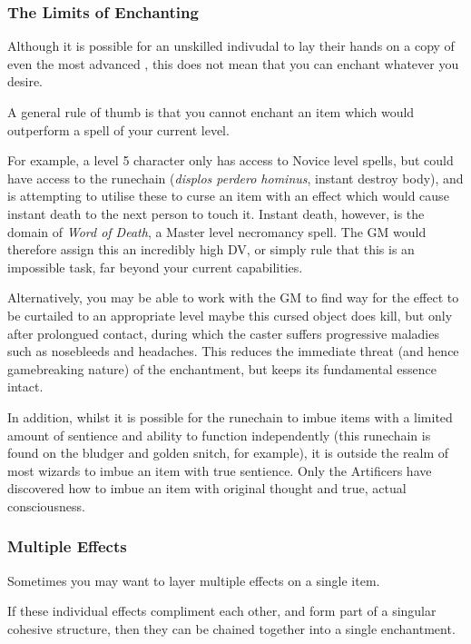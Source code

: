\subsubsection{The Limits of Enchanting}

Although it is possible for an unskilled indivudal to lay their hands on a copy of even the most advanced , this does not mean that you can enchant whatever you desire. 

A general rule of thumb is that you cannot enchant an item which would outperform a spell of your current level. 

For example, a level 5 character only has access to Novice level spells, but could have access to the runechain \rune{\displos\perdero\hominus} ({\it displos perdero hominus}, instant destroy body), and is attempting to utilise these  to curse an item with an effect which would cause instant death to the next person to touch it. Instant death, however, is the domain of {\it Word of Death}, a Master level necromancy spell. The GM would therefore assign this an incredibly high DV, or simply rule that this is an impossible task, far beyond your current capabilities. 

Alternatively, you may be able to work with the GM to find way for the effect to be curtailed to an appropriate level \minus{} maybe this cursed object does kill, but only after prolongued contact, during which the caster suffers progressive maladies such as nosebleeds and headaches. This reduces the immediate threat (and hence game\minus{}breaking nature) of the enchantment, but keeps its fundamental essence intact. 

In addition, whilst it is possible for the runechain \rune{\aeternum\cingo\sensus} to imbue items with a limited amount of sentience and ability to function independently (this runechain is found on the bludger and golden snitch, for example), it is outside the realm of most wizards to imbue an item with true sentience. Only the Artificers have discovered how to imbue an item with original thought and true, actual consciousness. 

\subsubsection{Multiple Effects}

Sometimes you may want to layer multiple effects on a single item. 

If these individual effects compliment each other, and form part of a singular cohesive structure, then they can be chained together into a single enchantment. 

